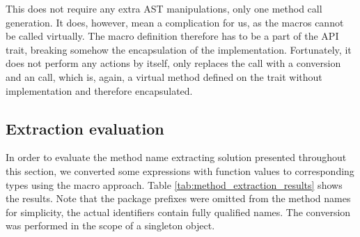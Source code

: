 This does not require any extra AST manipulations, only one method call generation. It does, however, mean a complication for us, as the macros cannot be called virtually. The macro definition therefore has to be a part of the  API trait, breaking somehow the encapsulation of the implementation. Fortunately, it does not perform any actions by itself, only replaces the  call with a conversion and an  call, which is, again, a virtual method defined on the trait without implementation and therefore encapsulated.

\subsection{Extraction evaluation}

In order to evaluate the method name extracting solution presented throughout this section, we converted some expressions with function values to corresponding  types using the macro approach. Table \ref{tab:method_extraction_results} shows the results. Note that the package prefixes were omitted from the method names for simplicity, the actual identifiers contain fully qualified names. The conversion was performed in the scope of a  singleton object.

